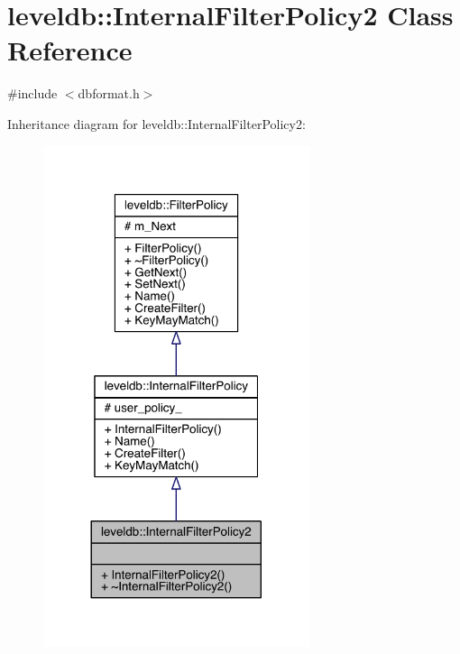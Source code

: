 \hypertarget{classleveldb_1_1_internal_filter_policy2}{}\section{leveldb\+:\+:Internal\+Filter\+Policy2 Class Reference}
\label{classleveldb_1_1_internal_filter_policy2}


{\ttfamily \#include $<$dbformat.\+h$>$}



Inheritance diagram for leveldb\+:\+:Internal\+Filter\+Policy2\+:\nopagebreak
\begin{figure}[H]
\begin{center}
\leavevmode
\includegraphics[width=221pt]{classleveldb_1_1_internal_filter_policy2__inherit__graph}
\end{center}
\end{figure}


